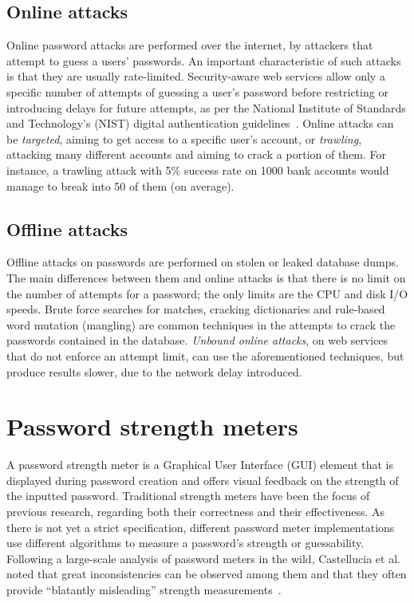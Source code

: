     \subsection{Online attacks}
      \label{ssec:online_attacks}
      Online password attacks are performed over the internet, by attackers that attempt to guess a users' passwords. An important characteristic of such attacks is that they are usually rate-limited. Security-aware web services allow only a specific number of attempts of guessing a user's password before restricting or introducing delays for future attempts, as per the National Institute of Standards and Technology's (NIST) digital authentication guidelines~\cite{NIST}. Online attacks can be \emph{targeted}, aiming to get access to a specific user's account, or \emph{trawling}, attacking many different accounts and aiming to crack a portion of them. For instance, a trawling attack with 5\% success rate on 1000 bank accounts would manage to break into 50 of them (on average).

    \subsection{Offline attacks}
      \label{ssec:offline_attacks}
      Offline attacks on passwords are performed on stolen or leaked database dumps. The main differences between them and online attacks is that there is no limit on the number of attempts for a password; the only limits are the CPU and disk I/O speeds. Brute force searches for matches, cracking dictionaries and rule-based word mutation (mangling) are common techniques in the attempts to crack the passwords contained in the database. \emph{Unbound online attacks}, on web services that do not enforce an attempt limit, can use the aforementioned techniques, but produce results slower, due to the network delay introduced.

  \section{Password strength meters}
    \label{sec:pass_str_meters}
    A password strength meter is a Graphical User Interface (GUI) element that is displayed during password creation and offers visual feedback on the strength of the inputted password. Traditional strength meters have been the focus of previous research, regarding both their correctness and their effectiveness. As there is not yet a strict specification, different password meter implementations use different algorithms to measure a password's strength or guessability. Following a large-scale analysis of password meters in the wild, Castellucia et al. noted that great inconsistencies can be observed among them and that they often provide ``blatantly misleading'' strength measurements~\cite{pass_str_meter_analysis}.

